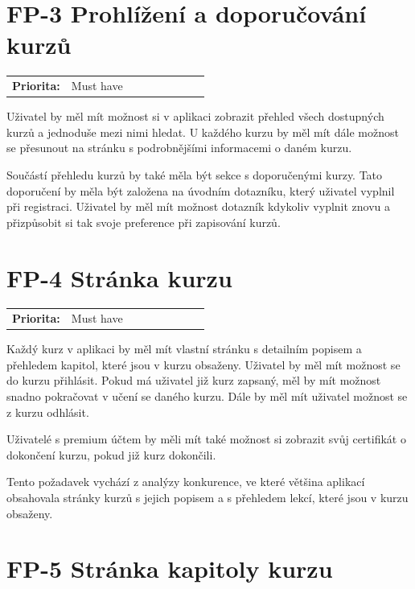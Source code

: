 \section{FP-3 Prohlížení a doporučování kurzů}\label{sec:fp-course-browse}

\begin{tabular}{lp{0.7\linewidth}}
    \textbf{Priorita:} & Must have \\
\end{tabular}

Uživatel by měl mít možnost si v aplikaci zobrazit přehled všech dostupných kurzů a jednoduše mezi nimi hledat. U každého kurzu by měl mít dále možnost se přesunout na stránku s podrobnějšími informacemi o daném kurzu.

Součástí přehledu kurzů by také měla být sekce s doporučenými kurzy. Tato doporučení by měla být založena na úvodním dotazníku, který uživatel vyplnil při registraci. Uživatel by měl mít možnost dotazník kdykoliv vyplnit znovu a přizpůsobit si tak svoje preference při zapisování kurzů.

\section{FP-4 Stránka kurzu}\label{sec:fp-course-page}

\begin{tabular}{lp{0.7\linewidth}}
    \textbf{Priorita:} & Must have \\
\end{tabular}

Každý kurz v aplikaci by měl mít vlastní stránku s detailním popisem a přehledem kapitol, které jsou v kurzu obsaženy. Uživatel by měl mít možnost se do kurzu přihlásit. Pokud má uživatel již kurz zapsaný, měl by mít možnost snadno pokračovat v učení se daného kurzu. Dále by měl mít uživatel možnost se z kurzu odhlásit.

Uživatelé s premium účtem by měli mít také možnost si zobrazit svůj certifikát o dokončení kurzu, pokud již kurz dokončili.

Tento požadavek vychází z analýzy konkurence, ve které většina aplikací obsahovala stránky kurzů s jejich popisem a s přehledem lekcí, které jsou v kurzu obsaženy.

\section{FP-5 Stránka kapitoly kurzu}\label{sec:fp-course-chapter-page}

